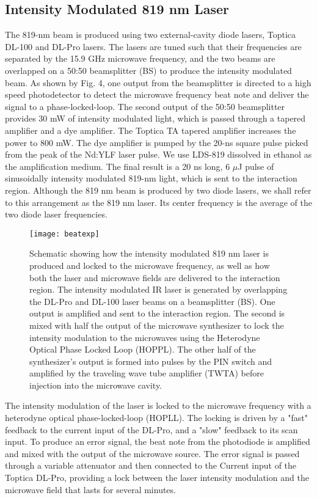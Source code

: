 \documentclass[aps,pra,preprint,groupedaddress]{revtex4-1}
\begin{document}
\subsection{\label{sec:ampmod} Intensity Modulated 819 nm Laser}



The 819-nm beam is produced using two external-cavity diode lasers, Toptica DL-100 and DL-Pro lasers. The lasers are tuned such that their frequencies are separated by the 15.9 GHz microwave frequency, and the two beams are overlapped on a 50:50 beamsplitter (BS) to produce the intensity modulated beam. As shown by Fig. 4, one output from the beamsplitter is directed to a high speed photodetector to detect the microwave frequency beat note and deliver the signal to a phase-locked-loop. The second output of the 50:50 beamsplitter provides 30 mW of intensity modulated light, which is passed through a tapered amplifier and a dye amplifier. The Toptica TA tapered amplifier increases the power to 800 mW. The dye amplifier is pumped by the 20-ns square pulse picked from the peak of the Nd:YLF laser pulse. We use LDS-819 dissolved in ethanol as the amplification medium. The final result is a 20 ns long, 6 $\mu$J pulse of sinusoidally intensity modulated 819-nm light, which is sent to the interaction region. Although the 819 nm beam is produced by two diode lasers, we shall refer to this arrangement as the 819 nm laser. Its center frequency is the average of the two diode laser frequencies.

\begin{figure}
	\texttt{[image: beatexp]}
	\caption{Schematic showing how the intensity modulated 819 nm laser is produced and locked to the microwave frequency, as well as how both the laser and microwave fields are delivered to the interaction region. The intensity modulated IR laser is generated by overlapping the DL-Pro and DL-100 laser beams on a beamsplitter (BS). One output is amplified and sent to the interaction region. The second is mixed with half the output of the microwave synthesizer to lock the intensity modulation to the microwaves using the Heterodyne Optical Phase Locked Loop (HOPPL). The other half of the synthesizer's output is formed into pulses by the PIN switch and amplified by the traveling wave tube amplifier (TWTA) before injection into the microwave cavity. }
	\label{fig:pll}
\end{figure}

The intensity modulation of the laser is locked to the microwave frequency with a heterodyne optical phase-locked-loop (HOPLL). The locking is driven by a "fast" feedback to the current input of the DL-Pro, and a "slow" feedback to its scan input. To produce an error signal, the beat note from the photodiode is amplified and mixed with the output of the microwave source. The error signal is passed through a variable attenuator and then connected to the Current input of the Toptica DL-Pro, providing a lock between the laser intensity modulation and the microwave field that lasts for several minutes.
\end{document}
